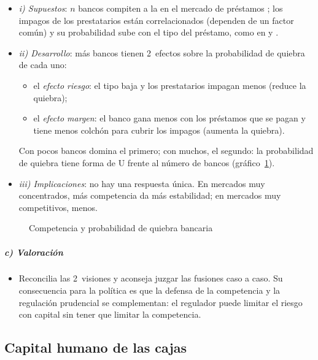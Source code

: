 \documentclass[11pt]{article}
\begin{document}
\begin{itemize}
\item \emph{i) Supuestos}: $n$ bancos compiten a la  en el mercado de préstamos ; los impagos de los prestatarios están correlacionados (dependen de un factor común) y su probabilidad sube con el tipo del préstamo, como en  y .
\item \emph{ii) Desarrollo}: más bancos tienen 2~efectos sobre la probabilidad de quiebra de cada uno:
  \begin{itemize}
  \item el \emph{efecto riesgo}: el tipo baja y los prestatarios impagan menos (reduce la quiebra);
  \item el \emph{efecto margen}: el banco gana menos con los préstamos que se pagan y tiene menos colchón para cubrir los impagos (aumenta la quiebra).
  \end{itemize}
  Con pocos bancos domina el primero; con muchos, el segundo: la probabilidad de quiebra tiene forma de U frente al número de bancos (gráfico~\ref{fig:competencia}).
\item \emph{iii) Implicaciones}: no hay una respuesta única. En mercados muy concentrados, más competencia da más estabilidad; en mercados muy competitivos, menos.
\end{itemize}

\begin{figure}[H]
\centering
\caption{Competencia y probabilidad de quiebra bancaria}\label{fig:competencia}
\end{figure}

\subparagraph{c) Valoración}

\begin{itemize}
\item Reconcilia las 2~visiones y aconseja juzgar las fusiones caso a caso. Su consecuencia para la política es que la defensa de la competencia y la regulación prudencial se complementan: el regulador puede limitar el riesgo con capital sin tener que limitar la competencia\nocite{Vives2016}.
\end{itemize}

\subsection{Capital humano de las cajas}\label{sec:cajas}
\end{document}
